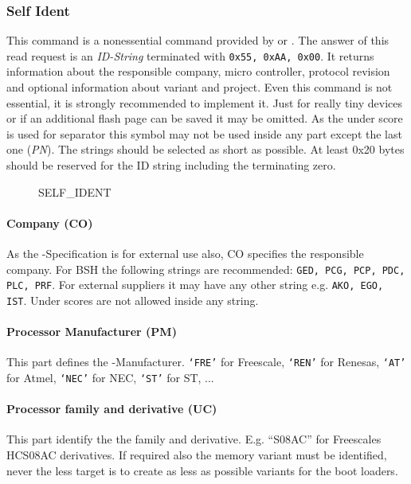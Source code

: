 \subsubsection{Self Ident}
\label{sec:CmdSelfIdent}
This command is a nonessential command provided by \bro{} or \bp. The answer of this read request is an \emph{ID-String} terminated with \texttt{0x55, 0xAA, 0x00}. It returns information about the responsible company, micro controller, protocol revision and optional information about \bl{} variant  and project. Even this command is not essential, it is strongly recommended to implement it. Just for really tiny devices or if an additional flash page can be saved it may be omitted. As the under score is used for separator this symbol may not be used inside any part except the last one (\emph{PN}). The strings should be selected as short as possible. At least 0x20 bytes should be reserved for the ID string including the terminating zero.

\begin{figure}[h]
\begin{center}
\caption{SELF_IDENT}
\label{fig:CmdSelfIdent}
\end{center}
\end{figure}

\paragraph{Company (CO)}
As the \bl{}-Specification is for external use also, CO specifies the responsible company. For BSH the following strings are recommended: \texttt{GED, PCG, PCP, PDC, PLC, PRF}. For external suppliers it may have any other string e.g. \texttt{AKO, EGO, IST}. Under scores are not allowed inside any string.

\paragraph{Processor Manufacturer (PM)}
This part defines the \uc-Manufacturer. \texttt{`FRE'} for Freescale, \texttt{`REN'} for Renesas, \texttt{`AT'} for Atmel, \texttt{`NEC'} for NEC, \texttt{`ST'} for ST, ...

\paragraph{Processor family and derivative (UC)}
This part identify the the \uc{} family and derivative. E.g. ``S08AC'' for Freescales HCS08AC derivatives. If required also the memory variant must be identified, never the less target is to create as less as possible variants for the boot loaders. 

